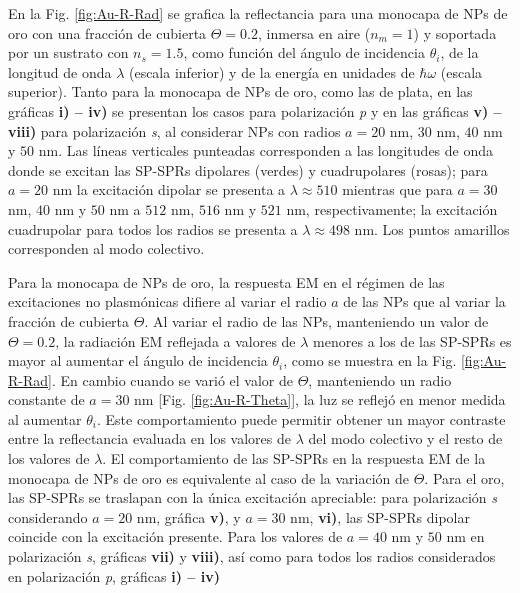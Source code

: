 En la Fig. \ref{fig:Au-R-Rad} se grafica la reflectancia para una monocapa de NPs de oro con una fracción de cubierta $\Theta = 0.2$, inmersa en aire ($n_m = 1$) y soportada por un sustrato con $n_s = 1.5$, como función del ángulo de incidencia $\theta_i$, de la longitud de onda $\lambda$ (escala inferior) y de la energía en unidades de $\hbar\omega$ (escala superior). Tanto para la monocapa de NPs de oro, como las de plata, en las gráficas \textbf{i) -- iv)} se presentan los casos para polarización \emph{p} y en las gráficas \textbf{v) -- viii)} para polarización \emph{s}, al considerar NPs con radios $a= 20$ nm, $30$ nm, $40$ nm y $50$ nm. Las líneas verticales punteadas corresponden a las longitudes de onda donde se excitan las SP-SPRs dipolares (verdes) y cuadrupolares (rosas); para $a= 20$ nm la excitación dipolar se presenta a $\lambda \approx 510$ mientras que para $a = 30$ nm, $40$ nm y $50$ nm a $512$ nm, $516$ nm y $521$ nm, respectivamente; la excitación cuadrupolar para todos los radios se presenta a $\lambda\approx 498$ nm. Los puntos amarillos corresponden al modo colectivo.

Para la monocapa de NPs de oro, la respuesta EM en el régimen de las excitaciones no plasmónicas difiere al variar el radio $a$ de las NPs que al variar la fracción de cubierta $\Theta$. Al variar el radio de las NPs, manteniendo un valor de $\Theta = 0.2$, la radiación EM reflejada a valores de $\lambda$ menores a los de las SP-SPRs es mayor al aumentar el ángulo de incidencia $\theta_i$, como se muestra en la Fig. \ref{fig:Au-R-Rad}. En cambio cuando se varió el valor de $\Theta$, manteniendo un radio constante de $a=30$ nm [Fig. \ref{fig:Au-R-Theta}], la luz se reflejó en menor medida al aumentar $\theta_i$. Este comportamiento puede permitir obtener un mayor contraste entre la reflectancia evaluada en los valores de $\lambda$ del modo colectivo y el resto de los valores de $\lambda$. El comportamiento de las SP-SPRs en la respuesta EM de la monocapa de NPs de oro es equivalente al caso de la variación de $\Theta$. Para el oro,  las SP-SPRs se traslapan con la única excitación apreciable: para polarización \emph{s} considerando $a= 20$ nm, gráfica \textbf{v)}, y $a= 30$ nm, \textbf{vi)}, las SP-SPRs dipolar coincide con la excitación presente. Para los valores de $a=40$ nm y $50$ nm en polarización \emph{s}, gráficas \textbf{vii)} y \textbf{viii)}, así como para todos los radios considerados en polarización \emph{p}, gráficas \textbf{i) -- iv)}

